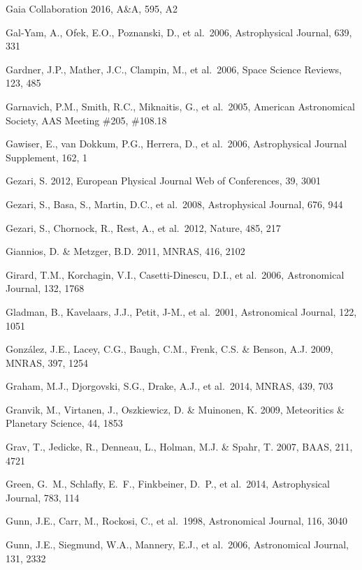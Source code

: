 \documentclass{emulateapj}
\begin{document}
\begin{thebibliography}{}
\bibitem[()]{} Gaia Collaboration 2016, A\&A, 595, A2 

\bibitem[()]{} Gal-Yam, A., Ofek, E.O., Poznanski, D., et al.~2006, Astrophysical Journal, 639, 331

\bibitem[()]{} Gardner, J.P., Mather, J.C., Clampin, M., et al.~2006, Space Science Reviews, 123, 485

\bibitem[()]{} Garnavich, P.M., Smith, R.C., Miknaitis, G., et al.~2005, 
             American Astronomical Society, AAS Meeting \#205, \#108.18 	

\bibitem[()]{} Gawiser, E., van Dokkum, P.G., Herrera, D., et al.~2006, Astrophysical Journal Supplement, 162, 1 

	
\bibitem[()]{} Gezari, S. 2012, European Physical Journal Web of Conferences, 39, 3001

\bibitem[()]{} Gezari, S., Basa, S., Martin, D.C., et al.~2008, Astrophysical Journal, 676, 944

\bibitem[()]{} Gezari, S., Chornock, R., Rest, A., et al.~2012, Nature, 485, 217 

\bibitem[()]{} Giannios, D. \& Metzger, B.D. 2011, MNRAS, 416, 2102

\bibitem[()]{} Girard, T.M., Korchagin, V.I., Casetti-Dinescu, D.I., et al.~2006, Astronomical 
             Journal, 132, 1768

\bibitem[()]{} Gladman, B., Kavelaars, J.J., Petit, J-M., et al.~2001, Astronomical Journal, 122, 1051

\bibitem[()]{} Gonz\'{a}lez, J.E., Lacey, C.G., Baugh, C.M., Frenk, C.S. \& Benson, A.J. 2009, MNRAS, 397, 1254

\bibitem[()]{} Graham, M.J., Djorgovski, S.G., Drake, A.J., et al.~2014, MNRAS, 439, 703 

\bibitem[()]{} Granvik, M., Virtanen, J., Oszkiewicz, D. \& Muinonen, K. 2009, Meteoritics \& Planetary Science, 44, 1853

\bibitem[()]{} Grav, T., Jedicke, R., Denneau, L., Holman, M.J.  \& Spahr, T. 2007, BAAS, 211, 4721

\bibitem[()]{} Green, G.~M., Schlafly, E.~F., Finkbeiner, D.~P., et al.~2014, Astrophysical Journal, 783, 114 

\bibitem[()]{} Gunn, J.E., Carr, M., Rockosi, C., et al.~1998, Astronomical Journal, 116, 3040

\bibitem[()]{} Gunn, J.E., Siegmund, W.A., Mannery, E.J., et al.~2006, Astronomical Journal, 131, 2332


\end{thebibliography}
\end{document}
